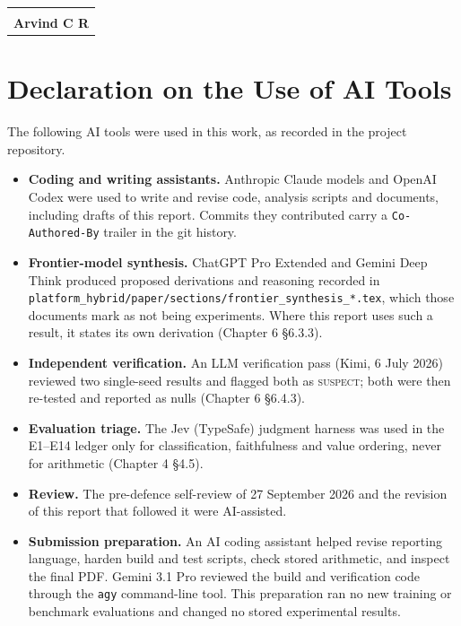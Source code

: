 \vspace{0.3in}
\noindent\begin{tabular}{@{}p{2.6in}@{}}

\dotfill \\
\textbf{Arvind C R} \\

\end{tabular}

\chapter*{Declaration on the Use of AI Tools}
\thispagestyle{plain}

The following AI tools were used in this work, as recorded in the project
repository.

\begin{itemize}
\item \textbf{Coding and writing assistants.} Anthropic Claude models and
OpenAI Codex were used to write and revise code, analysis scripts and
documents, including drafts of this report. Commits they contributed carry a
\texttt{Co-Authored-By} trailer in the git history.
\item \textbf{Frontier-model synthesis.} ChatGPT Pro Extended and Gemini Deep
Think produced proposed derivations and reasoning recorded in
\texttt{platform\_hybrid/paper/sections/frontier\_synthesis\_*.tex}, which those
documents mark as not being experiments. Where this report uses such a result,
it states its own derivation (Chapter 6 \S6.3.3).
\item \textbf{Independent verification.} An LLM verification pass (Kimi,
6 July 2026) reviewed two single-seed results and flagged both as
\textsc{suspect}; both were then re-tested and reported as nulls (Chapter 6
\S6.4.3).
\item \textbf{Evaluation triage.} The Jev (TypeSafe) judgment harness was used
in the E1--E14 ledger only for classification, faithfulness and value
ordering, never for arithmetic (Chapter 4 \S4.5).
\item \textbf{Review.} The pre-defence self-review of 27 September 2026 and the
revision of this report that followed it were AI-assisted.
\item \textbf{Submission preparation.} An AI coding assistant helped revise
reporting language, harden build and test scripts, check stored arithmetic,
and inspect the final PDF. Gemini 3.1 Pro reviewed the build and verification
code through the \texttt{agy} command-line tool. This preparation ran no new
training or benchmark evaluations and changed no stored experimental results.
\end{itemize}

